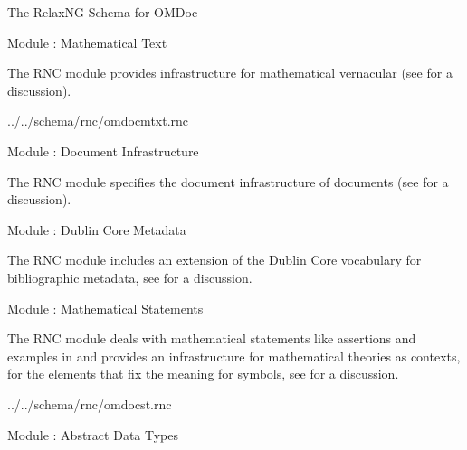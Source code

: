 \begin{tchapter}[id=rnc]{The RelaxNG Schema for OMDoc}
\begin{tsection}[id=rnc:mtxt]{Module {}: Mathematical Text}
  
 The RNC module {} provides infrastructure for mathematical
  vernacular (see {} for a discussion).

 
  {../../schema/rnc/omdocmtxt.rnc}
\end{tsection}

\begin{tsection}[id=rnc:doc]{Module {}: Document Infrastructure}
  
  The RNC module {} specifies the document infrastructure of
  {\omdoc} documents (see
  {} for a discussion).

  
  
\end{tsection}

\begin{tsection}[id=rnc:dc]{Module {}: Dublin Core Metadata}

  The RNC module {} includes an extension of the Dublin Core vocabulary for
  bibliographic metadata, see {} for a discussion.


\end{tsection}

\begin{tsection}[id=rnc:st]{Module {}: Mathematical Statements}

The RNC module {} deals with mathematical statements like assertions
and examples in {\omdoc} and provides an infrastructure for mathematical theories
as contexts, for the {\omdoc} elements that fix the meaning for symbols, see
{} for a discussion.

 {../../schema/rnc/omdocst.rnc}
\end{tsection}

\begin{tsection}[id=rnc:adt]{Module {}: Abstract Data Types}


\end{tsection}
\end{tchapter}
